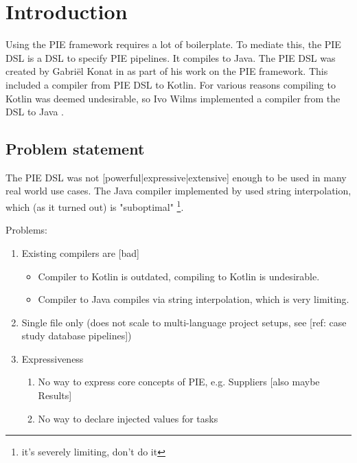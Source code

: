 
\chapter{\label{chap:introduction}Introduction}


Using the PIE framework requires a lot of boilerplate.
To mediate this, the PIE DSL is a DSL to specify PIE pipelines.
It compiles to Java.
The PIE DSL was created by Gabriël Konat in  as part of his work on the PIE framework.
This included a compiler from PIE DSL to Kotlin.
For various reasons compiling to Kotlin was deemed undesirable, so Ivo Wilms implemented a compiler from the DSL to Java .

\section{\label{sec:introduction__problem_statement}Problem statement}
The PIE DSL was not [powerful|expressive|extensive] enough to be used in many real world use cases.
The Java compiler implemented by used string interpolation, which (as it turned out) is "suboptimal" \footnote{it's severely limiting, don't do it}.

Problems:
\begin{enumerate}
  \item Existing compilers are [bad]
  \begin{itemize}
     \item Compiler to Kotlin is outdated, compiling to Kotlin is undesirable.
     \item Compiler to Java compiles via string interpolation, which is very limiting.
   \end{itemize}
  \item Single file only (does not scale to multi-language project setups, see [ref: case study database pipelines])
  \item Expressiveness
  \begin{enumerate}
    \item No way to express core concepts of PIE, e.g. Suppliers [also maybe Results]
    \item No way to declare injected values for tasks
  \end{enumerate}
\end{enumerate}

